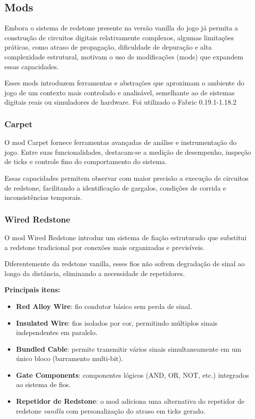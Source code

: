 \subsection{Mods}

Embora o sistema de redstone presente na versão vanilla do jogo já permita a construção de circuitos digitais relativamente complexos, algumas limitações práticas, como atraso de propagação, dificuldade de depuração e alta complexidade estrutural, motivam o uso de modificações (mods) que expandem essas capacidades.

Esses mods introduzem ferramentas e abstrações que aproximam o ambiente do jogo de um contexto mais controlado e analisável, semelhante ao de sistemas digitais reais ou simuladores de hardware. Foi utilizado o Fabric 0.19.1-1.18.2

\subsubsection{Carpet}

O mod Carpet fornece ferramentas avançadas de análise e instrumentação do jogo. Entre suas funcionalidades, destacam-se a medição de desempenho, inspeção de ticks e controle fino do comportamento do sistema.

Essas capacidades permitem observar com maior precisão a execução de circuitos de redstone, facilitando a identificação de gargalos, condições de corrida e inconsistências temporais.

\subsubsection{Wired Redstone}

O mod Wired Redstone introduz um sistema de fiação estruturado que substitui a redstone tradicional por conexões mais organizadas e previsíveis.

Diferentemente da redstone vanilla, esses fios não sofrem degradação de sinal ao longo da distância, eliminando a necessidade de repetidores.

\textbf{Principais itens:}
\begin{itemize}
    \item \textbf{Red Alloy Wire}: fio condutor básico sem perda de sinal.
    \item \textbf{Insulated Wire}: fios isolados por cor, permitindo múltiplos sinais independentes em paralelo.
    \item \textbf{Bundled Cable}: permite transmitir vários sinais simultaneamente em um único bloco (barramento multi-bit).
    \item \textbf{Gate Components}: componentes lógicos (AND, OR, NOT, etc.) integrados ao sistema de fios.
	\item \textbf{Repetidor de Redstone}: o mod adiciona uma alternativa do repetidor de redstone \textit{vanilla} com personalização do atraso em ticks gerado.
\end{itemize}


